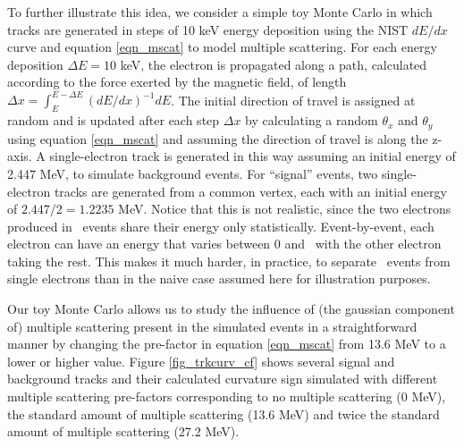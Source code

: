 \documentclass{JINST}
\begin{document}
To further illustrate this idea, we consider a simple toy Monte Carlo in which tracks are generated in steps of 10 keV energy
deposition using the NIST \cite{NIST_mac} $dE/dx$ curve and equation \ref{eqn_mscat} to model multiple scattering.  For each energy 
deposition $\Delta E = 10$ keV, the electron is propagated along a path, calculated according to the force exerted
by the magnetic field, of length $\Delta x = \int_{E}^{E-\Delta E}(dE/dx)^{-1}dE$.   The
initial direction of travel is assigned at random and is updated after each step $\Delta x$ 
by calculating a random $\theta_x$ and $\theta_y$ using equation \ref{eqn_mscat} and
assuming the direction of travel is along the z-axis.  A single-electron track is generated in this way 
assuming an initial energy of 2.447 MeV, to simulate background events.  For ``signal'' events, two 
single-electron tracks are generated from a common vertex, each with an initial energy of $2.447/2 = 1.2235$ MeV. Notice that this is not realistic, since the two electrons produced in \bbonu\ events share their energy only statistically. Event-by-event, each electron can have an energy that varies between 0 and \Qbb\, with the other electron taking the rest. This makes it much harder, in practice, to separate \bbonu\ events from single electrons than in the naive case assumed here for illustration purposes.

Our toy Monte Carlo allows us to study the influence of (the gaussian component of) multiple scattering present in the simulated events in a
straightforward manner by changing the pre-factor in equation \ref{eqn_mscat} from 13.6 MeV to a lower or higher value.  
Figure \ref{fig_trkcurv_cf} shows several signal and background tracks and their calculated curvature sign 
simulated with different multiple scattering pre-factors corresponding to no multiple scattering (0 MeV), the 
standard amount of multiple scattering (13.6 MeV) and twice the standard amount of multiple scattering (27.2 
MeV).  
\end{document}
